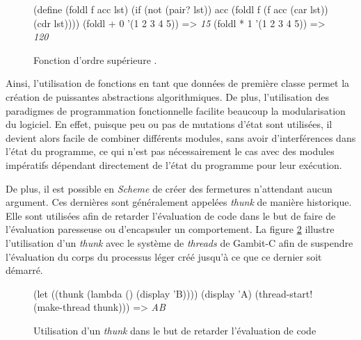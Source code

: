\documentclass[12pt,twoside,letterpaper,francais]{book}
\newcommand{\Schemelang}{{\textit{Scheme }}}
\newcommand{\scheme}[1]{\selectlanguage{english}{\tt #1}\selectlanguage{french}}
\newcommand{\schemeresult}[1]{{\it #1}}
\begin{document}
\begin{figure}[htb!]
  \begin{schemecode}
(define (foldl f acc lst)
    (if (not (pair? lst))
        acc
        (foldl f (f acc (car lst)) (cdr lst))))
(foldl + 0 '(1 2 3 4 5)) => \schemeresult{15}
(foldl * 1 '(1 2 3 4 5)) => \schemeresult{120}
  \end{schemecode}
  \caption{Fonction d'ordre supérieure \scheme{foldl}.}
  \label{Scheme:fold}
\end{figure}

Ainsi, l'utilisation de fonctions en tant que données de première
classe permet la création de puissantes abstractions
algorithmiques. De plus, l'utilisation des paradigmes de programmation
fonctionnelle facilite beaucoup la modularisation du logiciel. En
effet, puisque peu ou pas de mutations d'état sont utilisées, il
devient alors facile de combiner différents modules, sans avoir
d'interférences dans l'état du programme, ce qui n'est pas
nécessairement le cas avec des modules impératifs dépendant
directement de l'état du programme pour leur exécution.

De plus, il est possible en \Schemelang de créer des fermetures
n'attendant aucun argument. Ces dernières sont généralement appelées
\textit{thunk} de manière historique. Elle sont utilisées afin de
retarder l'évaluation de code dans le but de faire de l'évaluation
paresseuse ou d'encapsuler un comportement. La figure
\ref{Scheme:thunk} illustre l'utilisation d'un \textit{thunk} avec le
système de \textit{threads} de Gambit-C afin de suspendre l'évaluation
du corps du processus léger créé jusqu'à ce que ce dernier soit
démarré.

\begin{figure}[htb!]
  \begin{schemecode}
(let ((thunk (lambda () (display 'B))))
  (display 'A)
  (thread-start! (make-thread thunk))) => \schemeresult{AB}
  \end{schemecode}
  \caption{Utilisation d'un \textit{thunk} dans le but de retarder
    l'évaluation de code}
  \label{Scheme:thunk}
\end{figure}


\FloatBarrier
\end{document}
